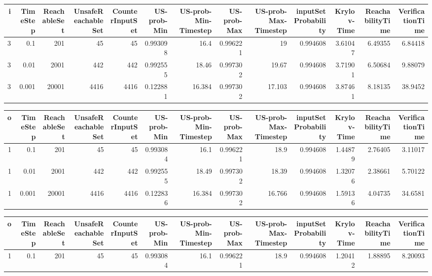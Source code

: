 \begin{tabular}{rrrrrrrrrrrrr}
\hline
   i &   TimeStep &   ReachableSet &   UnsafeReachableSet &   CounterInputSet &   US-prob-Min &   US-prob-Min-Timestep &   US-prob-Max &   US-prob-Max-Timestep &   inputSet Probability &   Krylov-Time &   ReachabilityTime &   VerificationTime \\
\hline
   3 &      0.1   &            201 &                   45 &                45 &      0.993098 &                 16.4   &      0.996221 &                 19     &               0.994608 &       3.61047 &            6.49355 &            6.84418 \\
   3 &      0.01  &           2001 &                  442 &               442 &      0.992555 &                 18.46  &      0.997302 &                 19.67  &               0.994608 &       3.71901 &            6.50684 &            9.88079 \\
   3 &      0.001 &          20001 &                 4416 &              4416 &      0.122881 &                 16.384 &      0.997302 &                 17.103 &               0.994608 &       3.87461 &            8.18135 &           38.9452  \\
\hline
\end{tabular}
\begin{tabular}{rrrrrrrrrrrrr}
\hline
   o &   TimeStep &   ReachableSet &   UnsafeReachableSet &   CounterInputSet &   US-prob-Min &   US-prob-Min-Timestep &   US-prob-Max &   US-prob-Max-Timestep &   inputSet Probability &   Krylov-Time &   ReachabilityTime &   VerificationTime \\
\hline
   1 &      0.1   &            201 &                   45 &                45 &      0.993084 &                 16.1   &      0.996221 &                 18.9   &               0.994608 &       1.44879 &            2.76405 &            3.11017 \\
   1 &      0.01  &           2001 &                  442 &               442 &      0.992555 &                 18.49  &      0.997302 &                 18.39  &               0.994608 &       1.32076 &            2.38661 &            5.70122 \\
   1 &      0.001 &          20001 &                 4416 &              4416 &      0.122836 &                 16.384 &      0.997302 &                 16.766 &               0.994608 &       1.59136 &            4.04735 &           34.6581  \\
\hline
\end{tabular}
\begin{tabular}{rrrrrrrrrrrrr}
\hline
   o &   TimeStep &   ReachableSet &   UnsafeReachableSet &   CounterInputSet &   US-prob-Min &   US-prob-Min-Timestep &   US-prob-Max &   US-prob-Max-Timestep &   inputSet Probability &   Krylov-Time &   ReachabilityTime &   VerificationTime \\
\hline
   1 &        0.1 &            201 &                   45 &                45 &      0.993084 &                   16.1 &      0.996221 &                   18.9 &               0.994608 &       1.20412 &            1.88895 &            8.20093 \\
\hline
\end{tabular}
